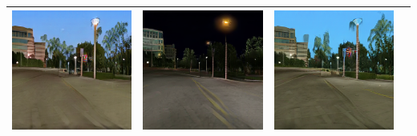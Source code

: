 \documentclass{VUMIFPSbakalaurinis}
\begin{document}
\begin{table}[H]
{\begin{tabular}{|c|c|c|c|}
            \includegraphics[scale=0.35]{img/pvz/7_cycle_v2} & \includegraphics[scale=0.35]{img/pvz/7_cut_v2} & \includegraphics[scale=0.35]{img/pvz/7_mspc_v2}
            \\
            \hline
            \end{tabular}
        }
        \label{tab:table example}
    \end{table}
\end{document}
